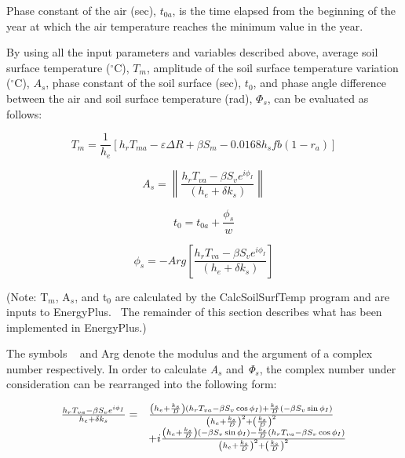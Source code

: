 Phase constant of the air (sec), \(t_{0a}\), is the time elapsed from the beginning of the year at which the air temperature reaches the minimum value in the year.

By using all the input parameters and variables described above, average soil surface temperature (\(^{\circ}\)C), \(T_{m}\), amplitude of the soil surface temperature variation (\(^{\circ}\)C), \({A_{s}}\), phase constant of the soil surface (sec), \(t_{0}\), and phase angle difference between the air and soil surface temperature (rad), \({\Phi_{s}}\), can be evaluated as follows:

\begin{equation}
{T_m} = \frac{1}{{{h_e}}}\left[ {{h_r}{T_{ma}} - \varepsilon \Delta R + \beta {S_m} - 0.0168{h_s}fb\left( {1 - {r_a}} \right)} \right]
\end{equation}

\begin{equation}
{A_s} = \left\| {\frac{{{h_r}{T_{va}} - \beta {S_v}{e^{i{\phi_I}}}}}{{\left( {{h_e} + \delta {k_s}} \right)}}} \right\|
\end{equation}

\begin{equation}
{t_0} = {t_{0a}} + \frac{{{\phi_s}}}{w}
\end{equation}

\begin{equation}
{\phi_s} =  - Arg\left[ {\frac{{{h_r}{T_{va}} - \beta {S_v}{e^{i{\phi_I}}}}}{{\left( {{h_e} + \delta {k_s}} \right)}}} \right]
\end{equation}

(Note: T\(_{m}\), A\(_{s}\), and t\(_{0}\) are calculated by the CalcSoilSurfTemp program and are inputs to EnergyPlus.~ The remainder of this section describes what has been implemented in EnergyPlus.)

The symbols \textbar{}\textbar{}~ \textbar{}\textbar{} and Arg denote the modulus and the argument of a complex number respectively. In order to calculate \emph{A\(_{s}\)} and \emph{Φ\(_{s}\)}, the complex number under consideration can be rearranged into the following form:

\begin{equation}
  \begin{array}{rl}
    \frac{h_r T_{va} - \beta S_v e^{i \phi_I}}{h_e + \delta k_s}
           =&  \frac{ \PB{h_e + \frac{k_s}{D}} \PB{ h_r T_{va} - \beta S_v \cos \phi_I} + \frac{k_s}{D} \PB{-\beta S_v \sin \phi_I}}{\PB{h_e + \frac{k_s}{D}}^2 + \PB{\frac{k_s}{D}}^2} \\
           &+ i\frac{ \PB{h_e + \frac{k_s}{D}} \PB{-\beta S_v \sin \phi_I} - \frac{k_s}{D} \PB{h_r T_{va} - \beta S_v \cos \phi_I}}{\PB{h_e + \frac{k_s}{D}}^2 + \PB{\frac{k_s}{D}}^2}
  \end{array}
\end{equation}

